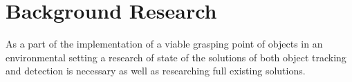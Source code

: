 \chapter{Background Research}\glsresetall
\label{cha:Research}
As a part of the implementation of a viable grasping point of objects in an environmental setting a research of state of the solutions of both object tracking and detection is necessary as well as researching full existing solutions.
